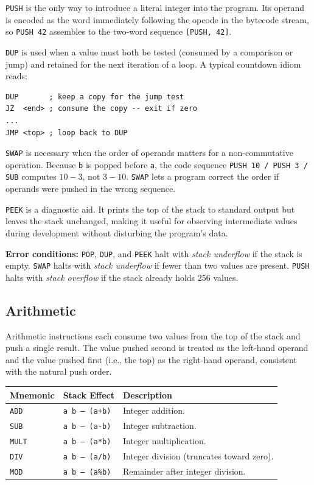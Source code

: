\texttt{PUSH} is the only way to introduce a literal integer into the program. Its operand is encoded as the word immediately following the opcode in the bytecode stream, so \texttt{PUSH 42} assembles to the two-word sequence \texttt{[PUSH, 42]}.

\texttt{DUP} is used when a value must both be tested (consumed by a comparison or jump) and retained for the next iteration of a loop. A typical countdown idiom reads:

\begin{lstlisting}
DUP       ; keep a copy for the jump test
JZ  <end> ; consume the copy -- exit if zero
...
JMP <top> ; loop back to DUP
\end{lstlisting}

\texttt{SWAP} is necessary when the order of operands matters for a non-commutative operation. Because \texttt{b} is popped before \texttt{a}, the code sequence \texttt{PUSH 10 / PUSH 3 / SUB} computes $10 - 3$, not $3 - 10$. \texttt{SWAP} lets a program correct the order if operands were pushed in the wrong sequence.

\texttt{PEEK} is a diagnostic aid. It prints the top of the stack to standard output but leaves the stack unchanged, making it useful for observing intermediate values during development without disturbing the program's data.

\textbf{Error conditions:} \texttt{POP}, \texttt{DUP}, and \texttt{PEEK} halt with \textit{stack underflow} if the stack is empty. \texttt{SWAP} halts with \textit{stack underflow} if fewer than two values are present. \texttt{PUSH} halts with \textit{stack overflow} if the stack already holds 256 values.

\subsection{Arithmetic}

Arithmetic instructions each consume two values from the top of the stack and push a single result. The value pushed second is treated as the left-hand operand and the value pushed first (i.e., the top) as the right-hand operand, consistent with the natural push order.

\begin{center}
\begin{tabular}{lll}
\toprule
\textbf{Mnemonic} & \textbf{Stack Effect}     & \textbf{Description} \\
\midrule
\texttt{ADD}  & \texttt{a b -- (a+b)} & Integer addition. \\
\texttt{SUB}  & \texttt{a b -- (a-b)} & Integer subtraction. \\
\texttt{MULT} & \texttt{a b -- (a*b)} & Integer multiplication. \\
\texttt{DIV}  & \texttt{a b -- (a/b)} & Integer division (truncates toward zero). \\
\texttt{MOD}  & \texttt{a b -- (a\%b)} & Remainder after integer division. \\
\bottomrule
\end{tabular}
\end{center}

